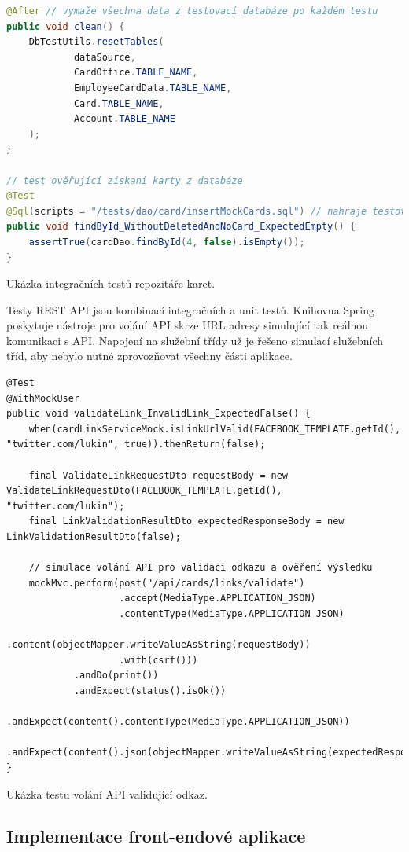 \begin{itemize}
\begin{itemize}
		\begin{lstlisting}[language=Java]
@After // vymaže všechna data z testovací databáze po každém testu
public void clean() {
	DbTestUtils.resetTables(
			dataSource,
			CardOffice.TABLE_NAME,
			EmployeeCardData.TABLE_NAME,
			Card.TABLE_NAME,
			Account.TABLE_NAME
	);
}

// test ověřující získaní karty z databáze
@Test
@Sql(scripts = "/tests/dao/card/insertMockCards.sql") // nahraje testovací data před spuštěním testu
public void findById_WithoutDeletedAndNoCard_ExpectedEmpty() {
	assertTrue(cardDao.findById(4, false).isEmpty());
}
		\end{lstlisting}
		Ukázka integračních testů repozitáře karet. %

		Testy \ac{REST} \ac{API} jsou kombinací integračních a unit testů.
		Knihovna Spring poskytuje nástroje pro volání \ac{API} skrze \ac{URL} adresy simulující tak reálnou komunikaci
		s \ac{API}.
		Napojení na služební třídy už je řešeno simulací služebních tříd, aby nebylo nutné zprovozňovat všechny části
		aplikace.

		\begin{lstlisting}[langauge=Java]
@Test
@WithMockUser
public void validateLink_InvalidLink_ExpectedFalse() {
	when(cardLinkServiceMock.isLinkUrlValid(FACEBOOK_TEMPLATE.getId(), "twitter.com/lukin", true)).thenReturn(false);

	final ValidateLinkRequestDto requestBody = new ValidateLinkRequestDto(FACEBOOK_TEMPLATE.getId(), "twitter.com/lukin");
	final LinkValidationResultDto expectedResponseBody = new LinkValidationResultDto(false);

	// simulace volání API pro validaci odkazu a ověření výsledku
	mockMvc.perform(post("/api/cards/links/validate")
					.accept(MediaType.APPLICATION_JSON)
					.contentType(MediaType.APPLICATION_JSON)
					.content(objectMapper.writeValueAsString(requestBody))
					.with(csrf()))
			.andDo(print())
			.andExpect(status().isOk())
			.andExpect(content().contentType(MediaType.APPLICATION_JSON))
			.andExpect(content().json(objectMapper.writeValueAsString(expectedResponseBody)));
}
		\end{lstlisting}
		Ukázka testu volání API validující odkaz. %

	\subsection{Implementace front-endové aplikace}




\end{itemize}
\end{itemize}
